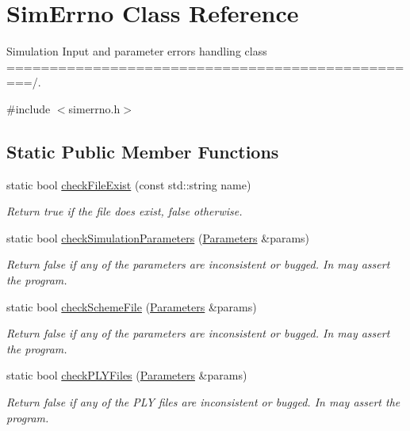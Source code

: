 \hypertarget{class_sim_errno}{}\section{Sim\+Errno Class Reference}
\label{class_sim_errno}


Simulation Input and parameter errors handling class =================================================/.  




{\ttfamily \#include $<$simerrno.\+h$>$}

\subsection*{Static Public Member Functions}
\begin{DoxyCompactItemize}
\item 
static bool \hyperlink{class_sim_errno_a8786cb077da0c41a32cd5d96f03fde35}{check\+File\+Exist} (const std\+::string name)
\begin{DoxyCompactList}\small\item\em Return true if the file does exist, false otherwise. \end{DoxyCompactList}\item 
static bool \hyperlink{class_sim_errno_aabc7284492cb5f8ef38fce7d4501abbd}{check\+Simulation\+Parameters} (\hyperlink{class_parameters}{Parameters} \&params)
\begin{DoxyCompactList}\small\item\em Return false if any of the parameters are inconsistent or bugged. In may assert the program. \end{DoxyCompactList}\item 
static bool \hyperlink{class_sim_errno_ad5048e2a5f5630118ec614afdd4fd197}{check\+Scheme\+File} (\hyperlink{class_parameters}{Parameters} \&params)
\begin{DoxyCompactList}\small\item\em Return false if any of the parameters are inconsistent or bugged. In may assert the program. \end{DoxyCompactList}\item 
static bool \hyperlink{class_sim_errno_a3a4c60541ecf163e50f70f8b9795be29}{check\+P\+L\+Y\+Files} (\hyperlink{class_parameters}{Parameters} \&params)
\begin{DoxyCompactList}\small\item\em Return false if any of the P\+LY files are inconsistent or bugged. In may assert the program. \end{DoxyCompactList}\item 

\end{DoxyCompactItemize}
